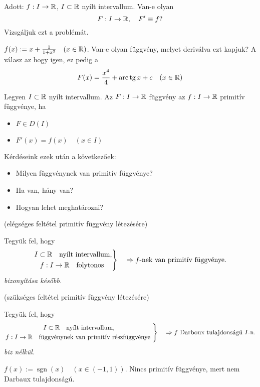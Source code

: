 \documentclass[a4paper,11.5pt]{article}
\DeclareMathOperator{\tg}{tg}
\DeclareMathOperator{\sgn}{sgn}
\DeclareMathOperator{\arc}{arc}
\begin{document}
	Adott: $f:I\to\mathbb{R}$, $I\subset\mathbb{R}$ nyílt intervallum. Van-e olyan
	\[ F:I\to\mathbb{R},\quad F'\equiv f? \]
	Vizsgáljuk ezt a problémát.
	\begin{example}
		$f(x):= x+\frac{1}{1+x^2}\quad (x\in\mathbb{R})$. Van-e olyan függvény, melyet deriválva ezt kapjuk? A válasz az hogy igen, ez pedig a
		\[ F(x)=\frac{x^4}{4}+\arc\tg x + c\quad (x\in\R) \]
	\end{example}
	\begin{definition}
		Legyen $I\subset\mathbb{R}$ nyílt intervallum.  Az $F:I\to\mathbb{R}$ függvény az $f:I\to\mathbb{R}$ primitív függvénye, ha 
		\begin{itemize}[$\bullet$]
			\item $F\in D(I)$
			\item $F'(x)=f(x)\quad (x\in I)$
		\end{itemize}
	\end{definition}
	Kérdéseink ezek után a következőek:
	\begin{itemize}
		\item Milyen függvénynek van primitív függvénye?
		\item Ha van, hány van?
		\item Hogyan lehet meghatározni?
	\end{itemize}
	\begin{theorem}
		(elégséges feltétel primitív függvény létezésére)
		
		Tegyük fel, hogy 
		\[\left.\begin{gathered}
		I\subset\mathbb{R} \quad \text{nyílt intervallum,} \\
		f:I\to\mathbb{R} \quad \text{{folytonos} }	
		\end{gathered}\right\}\quad \Rightarrow \text{$f$-nek van primitív függvénye.}	\]
		\textit{bizonyítása később.}
	\end{theorem}
	\begin{theorem}
		(szükséges feltétel primitív függvény létezésére)
		
		Tegyük fel, hogy 
		\[\left.\begin{gathered}
			I\subset\mathbb{R} \quad \text{nyílt intervallum,} \\
			f:I\to\mathbb{R}\quad  \text{{függvénynek van primitív részfüggvénye} }	
		\end{gathered}\right\}\quad \Rightarrow \text{$f$ Darboux tulajdonságú $I$-n.}	\]
		\textit{biz nélkül.}
	\end{theorem}
	\begin{example}
		$f(x):={\sgn}(x)\quad (x\in(-1,1))$. Nincs primitív függvénye, mert nem Darbaux tulajdonságú.
	\end{example}
\end{document}
